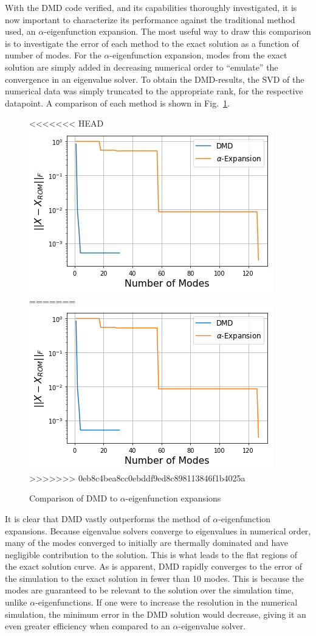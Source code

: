 \documentclass{style/nseJournal}
\newcommand{\LFI}[1]{\label{fi:#1}}
\newcommand{\FI}[1]{Fig.~\ref{fi:#1}}
\newcommand{\bfg}{\begin{figure}}
\newcommand{\efg}{\end{figure}}
\begin{document}
With the DMD code verified, and its capabilities thoroughly investigated, it is now important to characterize its performance against the traditional method used, an $\alpha$-eigenfunction expansion.  
The most useful way to draw this comparison is to investigate the error of each method to the exact solution as a function of number of modes.  
For the $\alpha$-eigenfunction expansion, modes from the exact solution are simply added in decreasing numerical order to ``emulate'' the convergence in an eigenvalue solver.  
To obtain the DMD-results, the SVD of the numerical data was simply truncated to the appropriate rank, for the respective datapoint.  
A comparison of each method is shown in \FI{comp}.  
\bfg[!htb] \centering
<<<<<<< HEAD
\includegraphics[scale=0.5]{figures/method_comparison.jpg}
=======
\includegraphics[scale=0.5]{figures/method_comparison.png}
>>>>>>> 0eb8c4bea8cc0ebddf9ed8c898113846f1b4025a
	\caption{Comparison of DMD to $\alpha$-eigenfunction expansions}
	\LFI{comp}
\efg

It is clear that DMD vastly outperforms the method of $\alpha$-eigenfunction expansions.  
Because eigenvalue solvers converge to eigenvalues in numerical order, many of the modes converged to initially are thermally dominated and have negligible contribution to the solution.  
This is what leads to the flat regions of the exact solution curve.  
As is apparent, DMD rapidly converges to the error of the simulation to the exact solution in fewer than 10 modes.  
This is because the modes are guaranteed to be relevant to the solution over the simulation time, unlike $\alpha$-eigenfunctions.  
If one were to increase the resolution in the numerical simulation, the minimum error in the DMD solution would decrease, giving it an even greater efficiency when compared to an $\alpha$-eigenvalue solver.  
\end{document}
